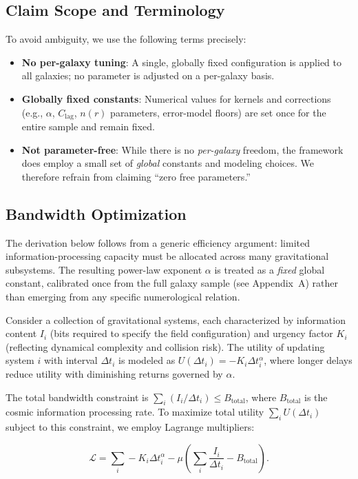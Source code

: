 \documentclass[12pt,a4paper]{article}
\begin{document}
\subsection*{Claim Scope and Terminology}
\noindent To avoid ambiguity, we use the following terms precisely:
\begin{itemize}
  \item \textbf{No per-galaxy tuning}: A single, globally fixed configuration is applied to all galaxies; no parameter is adjusted on a per-galaxy basis.
  \item \textbf{Globally fixed constants}: Numerical values for kernels and corrections (e.g., $\alpha$, $C_\mathrm{lag}$, $n(r)$ parameters, error-model floors) are set once for the entire sample and remain fixed.
  \item \textbf{Not parameter-free}: While there is no \emph{per-galaxy} freedom, the framework does employ a small set of \emph{global} constants and modeling choices. We therefore refrain from claiming “zero free parameters.”
\end{itemize}

\subsection{Bandwidth Optimization}

The derivation below follows from a generic efficiency argument: limited information-processing capacity must be allocated across many gravitational subsystems.  The resulting power-law exponent $\alpha$ is treated as a \emph{fixed} global constant, calibrated once from the full galaxy sample (see Appendix~A) rather than emerging from any specific numerological relation.

Consider a collection of gravitational systems, each characterized by information content $I_i$ (bits required to specify the field configuration) and urgency factor $K_i$ (reflecting dynamical complexity and collision risk). The utility of updating system $i$ with interval $\Delta t_i$ is modeled as $U(\Delta t_i) = -K_i \Delta t_i^\alpha$, where longer delays reduce utility with diminishing returns governed by $\alpha$.

The total bandwidth constraint is $\sum_i (I_i / \Delta t_i) \leq B_\mathrm{total}$, where $B_\mathrm{total}$ is the cosmic information processing rate. To maximize total utility $\sum_i U(\Delta t_i)$ subject to this constraint, we employ Lagrange multipliers:

\begin{equation}
\mathcal{L} = \sum_i -K_i \Delta t_i^\alpha - \mu \left( \sum_i \frac{I_i}{\Delta t_i} - B_\mathrm{total} \right).
\end{equation}
\end{document}
